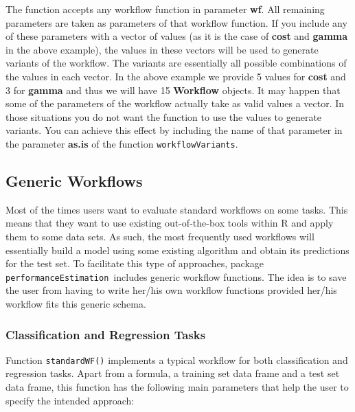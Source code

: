 \documentclass[10pt,a4paper]{article}\usepackage[]{graphicx}\usepackage[]{color}
\newcommand{\PE}{package \texttt{performanceEstimation}\ }
\begin{document}
The function accepts any workflow function in parameter
\textbf{wf}. All remaining parameters are taken as parameters of that
workflow function. If you include  any of these parameters with a vector of values
(as it is the case of \textbf{cost} and \textbf{gamma} in the above
example), the values in these vectors will be used to generate
variants of the workflow. The variants are essentially all possible
combinations of the values in each vector. In the above example we
provide 5 values for \textbf{cost} and 3 for \textbf{gamma} and thus
we will have 15 \textbf{Workflow} objects. It may happen that some of
the parameters of the workflow actually take as valid values a
vector. In those situations you do not want the function to use the
values to generate variants. You can achieve this effect by including
the name of that parameter in the parameter \textbf{as.is} of the
function \texttt{workflowVariants}.


\subsection{Generic Workflows}

Most of the times users want to evaluate standard workflows on some tasks. This means that they want to use existing out-of-the-box tools within R and apply them to some data sets.  As such, 
the most frequently used workflows will essentially build a model
using some existing algorithm and obtain its predictions for the test set. To facilitate this type of approaches, \PE includes generic workflow functions. The idea is to save the user
from having to write her/his own workflow functions provided her/his workflow fits
this generic schema.

\subsubsection{Classification and Regression Tasks}\label{sec:standardWF}

Function \texttt{standardWF()} implements a typical workflow for both
classification and regression tasks. Apart from a formula, a training set data frame and a test set data frame, this function has the following main parameters that help the user to specify the intended approach:
\end{document}
